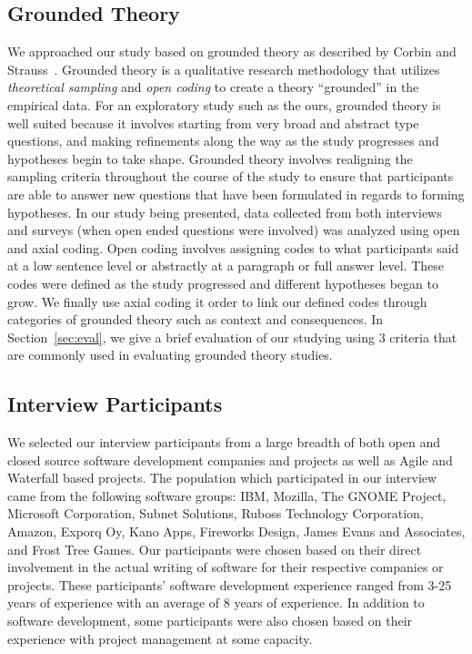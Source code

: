 \documentclass[conference]{IEEEtran}
\begin{document}
\subsection{Grounded Theory}
We approached our study based on grounded theory as described by Corbin and Strauss~\cite{Corbin:1998:SP}.
Grounded theory is a qualitative research methodology that utilizes \textit{theoretical sampling} and
\textit{open coding} to create a theory ``grounded'' in the empirical data. For an exploratory study such as
the ours, grounded theory is well suited because it involves starting from very broad and abstract type questions, and
making refinements along the way as the study progresses and hypotheses begin to take shape. Grounded theory involves
realigning the sampling criteria throughout the course of the study to ensure that participants are able to answer new
questions that have been formulated in regards to forming hypotheses. In our study being presented, data collected from
both interviews and surveys (when open ended questions were involved) was analyzed using open and axial coding. Open coding involves
assigning codes to what participants said at a low sentence level or abstractly at a paragraph or full answer level. These
codes were defined as the study progressed and different hypotheses began to grow. We finally use axial coding it order to
link our defined codes through categories of grounded theory such as context and consequences. 
In Section~\ref{sec:eval}, we give a brief evaluation of our studying using 
3 criteria that are commonly used in evaluating grounded theory studies.

\subsection{Interview Participants}

We selected our interview participants from a large breadth of both open and closed source software development companies
and projects as well as Agile and Waterfall based projects.
The population which participated in our interview came from the following software groups: 
IBM, Mozilla, The GNOME Project, Microsoft Corporation, Subnet Solutions, Ruboss Technology Corporation, 
Amazon, Exporq Oy, Kano Apps, Fireworks Design, James Evans and Associates, and Frost Tree Games. 
Our participants were chosen based on their direct involvement in the actual writing of software for
their respective companies or projects. These participants' software development experience ranged from 3-25 years of experience
with an average of 8 years of experience.
In addition to software development, some participants were also chosen based on their experience with project management
at some capacity.
\end{document}
